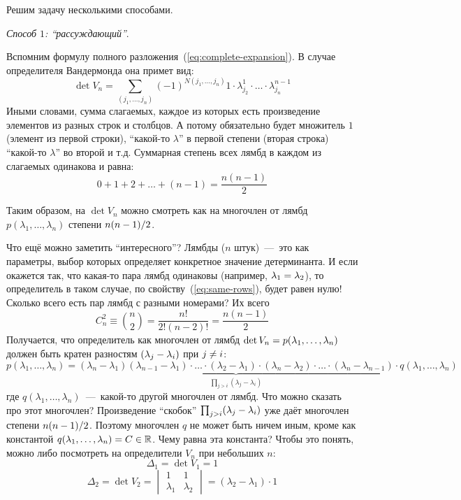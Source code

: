 \documentclass[a4paper,12pt]{article}
\theoremstyle{remark}
\begin{document}
  \begin{solution}
    Решим задачу несколькими способами.
    
    \medskip
    
    \emph{Способ $1$: ``рассуждающий''}.
    
    Вспомним формулу полного разложения~(\ref{eq:complete-expansion}).
    В случае определителя Вандермонда она примет вид:
    \begin{equation}\label{eq:p14-24-7-full-expansion}
      \det V_n = \sum_{(j_1, \ldots, j_n)} (-1)^{N(j_1, \ldots, j_n)} 1 \cdot \lambda_{j_2}^1 \cdot \ldots \cdot \lambda_{j_n}^{n-1}
    \end{equation}
    Иными словами, сумма слагаемых, каждое из которых есть произведение элементов из разных строк и столбцов.
    А потому обязательно будет множитель $1$ (элемент из первой строки), ``какой-то $\lambda$'' в первой степени (вторая строка) ``какой-то $\lambda$'' во второй и т.д.
    Суммарная степень всех лямбд в каждом из слагаемых одинакова и равна:
    \[
      0 + 1 + 2 + \ldots + (n-1) = \frac{n(n-1)}{2}
    \]
    
    Таким образом, на $\det V_n$ можно смотреть как на многочлен от лямбд $p(\lambda_1, \ldots, \lambda_n)$ степени $n(n \hm- 1) \hm/ 2$.
    
    Что ещё можно заметить ``интересного''?
    Лямбды ($n$ штук)~---~это как параметры, выбор которых определяет конкретное значение детерминанта.
    И если окажется так, что какая-то пара лямбд одинаковы (например, $\lambda_1 \hm= \lambda_2$), то определитель в таком случае, по свойству~(\ref{eq:same-rows}), будет равен нулю!
    Сколько всего есть пар лямбд с разными номерами?
    Их всего
    \[
      C_n^2 \equiv \binom{n}{2} = \frac{n!}{2!(n-2)!} = \frac{n(n-1)}{2}
    \]
    Получается, что определитель как многочлен от лямбд $\det V_n \hm= p(\lambda_1, \ldots, \lambda_n)$ должен быть кратен разностям $(\lambda_j \hm- \lambda_i)$ при $j \hm{\not=} i$:
    \[
      p(\lambda_1, \ldots, \lambda_n) = \underbrace{(\lambda_{n} - \lambda_1) (\lambda_{n-1} - \lambda_1) \cdot \ldots \cdot (\lambda_2 - \lambda_1) \cdot (\lambda_{n} - \lambda_2) \cdot \ldots \cdot (\lambda_{n} - \lambda_{n-1})}_{\prod_{j > i} (\lambda_j - \lambda_i)} \cdot q(\lambda_1, \ldots, \lambda_n)
    \]
    где $q(\lambda_1, \ldots, \lambda_n)$~---~какой-то другой многочлен от лямбд.
    Что можно сказать про этот многочлен?
    Произведение ``скобок'' $\prod_{j > i} (\lambda_j \hm- \lambda_i)$ уже даёт многочлен степени $n(n\hm-1) \hm/ 2$.
    Поэтому многочлен $q$ не может быть ничем иным, кроме как константой $q(\lambda_1, \ldots, \lambda_n) \hm= C \hm\in \RR$.
    Чему равна эта константа?
    Чтобы это понять, можно либо посмотреть на определители $V_n$ при небольших $n$:
    \[
      \Delta_1 = \det V_1 = 1
    \]
    \[
      \Delta_2 = \det V_2 = \begin{vmatrix}
        1         & 1\\
        \lambda_1 & \lambda_2
      \end{vmatrix} = (\lambda_2 - \lambda_1) \cdot 1
    \]
    

\end{solution}
\end{document}

